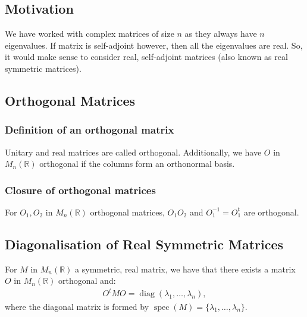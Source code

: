 \documentclass[a4paper, 12pt, twoside]{article}
\DeclareMathOperator{\Diag}{diag}
\DeclareMathOperator{\Spec}{spec}
\begin{document}
\subsection{Motivation}

We have worked with complex matrices of size $n$ as they always have
$n$ eigenvalues. If matrix is self-adjoint however, then all the
eigenvalues are real. So, it would make sense to consider real,
self-adjoint matrices (also known as real symmetric matrices).

\subsection{Orthogonal Matrices}

\subsubsection{Definition of an orthogonal matrix}

Unitary and real matrices are called orthogonal. Additionally,
we have $O$ in $M_n(\mathbb{R})$ orthogonal if the columns form
an orthonormal basis.

\subsubsection{Closure of orthogonal matrices}

For $O_1, O_2$ in $M_n(\mathbb{R})$ orthogonal matrices, $O_1O_2$ and
$O_1^{-1} = O_1^t$ are orthogonal.

\subsection{Diagonalisation of Real Symmetric Matrices}

For $M$ in $M_n(\mathbb{R})$ a symmetric, real matrix, we have that 
there exists a matrix $O$ in $M_n(\mathbb{R})$ orthogonal and:
\begin{align*}
  O^tMO = \Diag(\lambda_1, \ldots, \lambda_n),
\end{align*}
where the diagonal matrix is formed by 
$\Spec(M) = \{\lambda_1, \ldots, \lambda_n\}$.
\end{document}
